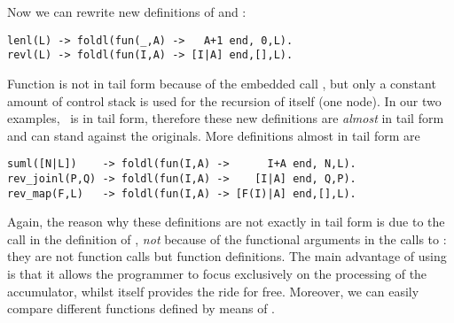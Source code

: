 Now we can rewrite new definitions of  and
:
\begin{verbatim}
lenl(L) -> foldl(fun(_,A) ->   A+1 end, 0,L).
revl(L) -> foldl(fun(I,A) -> [I|A] end,[],L).
\end{verbatim}
Function  is not in tail form because of the embedded
call , but only a constant amount of control stack is
used for the recursion of  itself (one node). In our
two examples, ~is in tail form, therefore these new
definitions are \emph{almost} in tail form and can stand against the
originals. More definitions almost in tail form are
\begin{verbatim}
suml([N|L])    -> foldl(fun(I,A) ->      I+A end, N,L).
rev_joinl(P,Q) -> foldl(fun(I,A) ->    [I|A] end, Q,P).
rev_map(F,L)   -> foldl(fun(I,A) -> [F(I)|A] end,[],L).
\end{verbatim}
Again, the reason why these definitions are not exactly in tail form
is due to the call  in the definition of
, \emph{not} because of the functional arguments
 in the calls to : they
are not function calls but function definitions. The main advantage of
using  is that it allows the programmer to focus
exclusively on the processing of the accumulator, whilst
 itself provides the ride for free. Moreover, we can
easily compare different functions defined by means of
.

